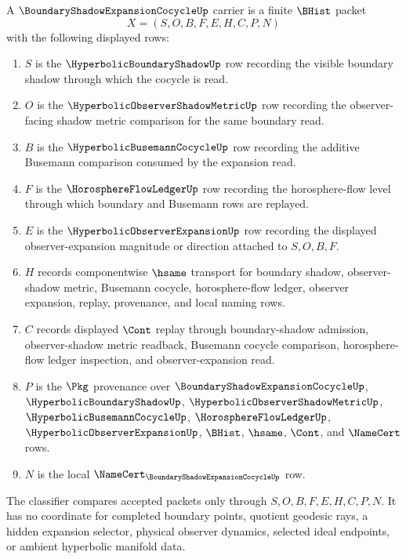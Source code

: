 \begin{definition}
\label{def:boundary-shadow-expansion-cocycle-carrier}
A $\BoundaryShadowExpansionCocycleUp$ carrier is a finite $\BHist$ packet
$$
X=(S,O,B,F,E,H,C,P,N)
$$
with the following displayed rows:
\begin{enumerate}
\item $S$ is the $\HyperbolicBoundaryShadowUp$ row recording the visible boundary shadow through which the cocycle is read.
\item $O$ is the $\HyperbolicObserverShadowMetricUp$ row recording the observer-facing shadow metric comparison for the same boundary read.
\item $B$ is the $\HyperbolicBusemannCocycleUp$ row recording the additive Busemann comparison consumed by the expansion read.
\item $F$ is the $\HorosphereFlowLedgerUp$ row recording the horosphere-flow level through which boundary and Busemann rows are replayed.
\item $E$ is the $\HyperbolicObserverExpansionUp$ row recording the displayed observer-expansion magnitude or direction attached to $S,O,B,F$.
\item $H$ records componentwise $\hsame$ transport for boundary shadow, observer-shadow metric, Busemann cocycle, horosphere-flow ledger, observer expansion, replay, provenance, and local naming rows.
\item $C$ records displayed $\Cont$ replay through boundary-shadow admission, observer-shadow metric readback, Busemann cocycle comparison, horosphere-flow ledger inspection, and observer-expansion read.
\item $P$ is the $\Pkg$ provenance over $\BoundaryShadowExpansionCocycleUp$, $\HyperbolicBoundaryShadowUp$, $\HyperbolicObserverShadowMetricUp$, $\HyperbolicBusemannCocycleUp$, $\HorosphereFlowLedgerUp$, $\HyperbolicObserverExpansionUp$, $\BHist$, $\hsame$, $\Cont$, and $\NameCert$ rows.
\item $N$ is the local $\NameCert_{\BoundaryShadowExpansionCocycleUp}$ row.
\end{enumerate}
The classifier compares accepted packets only through $S,O,B,F,E,H,C,P,N$. It has no coordinate for completed boundary points, quotient geodesic rays, a hidden expansion selector, physical observer dynamics, selected ideal endpoints, or ambient hyperbolic manifold data.
\end{definition}

